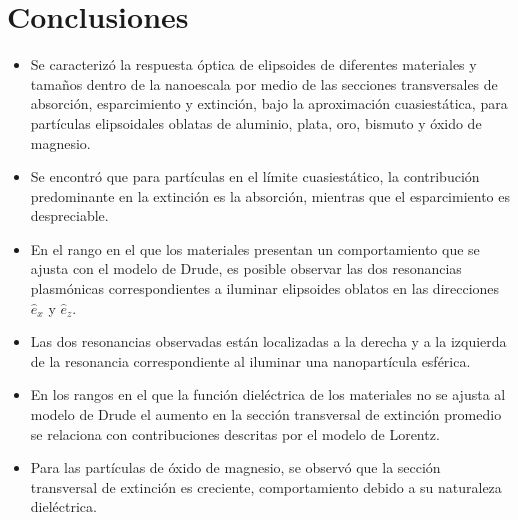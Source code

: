 \section{Conclusiones}
\begin{itemize}
	
	\item Se caracterizó la respuesta óptica de elipsoides de diferentes materiales y tamaños dentro de la nanoescala por medio de las secciones transversales de absorción, esparcimiento y extinción, bajo la aproximación cuasiestática, para partículas elipsoidales oblatas de aluminio, plata, oro, bismuto y óxido de magnesio. 
	\item Se encontró que para partículas en el límite cuasiestático, la contribución predominante en la extinción es la absorción, mientras que el esparcimiento es despreciable.
	\item En el rango en el que los materiales  presentan un comportamiento que se ajusta con el modelo de Drude, es posible observar las dos resonancias plasmónicas correspondientes a iluminar elipsoides oblatos en las direcciones $\hat{e}_x$ y $\hat{e}_z$.
	\item Las dos resonancias observadas están localizadas a la derecha y a la izquierda de la resonancia correspondiente al iluminar una nanopartícula esférica.
	\item En los rangos en el que la función dieléctrica de los materiales no se ajusta al modelo de Drude el aumento en la sección transversal de extinción promedio se relaciona con contribuciones descritas por el modelo de Lorentz.
	\item Para las partículas de óxido de magnesio, se observó que la sección transversal de extinción es creciente, comportamiento debido a su naturaleza dieléctrica.
	
	
	\end{itemize}


